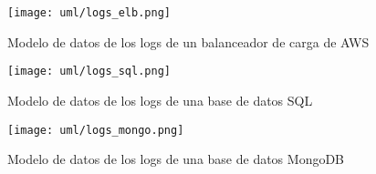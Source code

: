 \begin{figure}[H]
	\centering
	\texttt{[image: uml/logs\_elb.png]}
	\caption{Modelo de datos de los logs de un balanceador de carga de AWS}
	\label{fig:logs_elb}
\end{figure}

\begin{figure}[H]
	\centering
	\texttt{[image: uml/logs\_sql.png]}
	\caption{Modelo de datos de los logs de una base de datos SQL}
	\label{fig:logs_sql}
\end{figure}

\begin{figure}[H]
	\centering
	\texttt{[image: uml/logs\_mongo.png]}
	\caption{Modelo de datos de los logs de una base de datos MongoDB}
	\label{fig:logs_mongo}
\end{figure}
